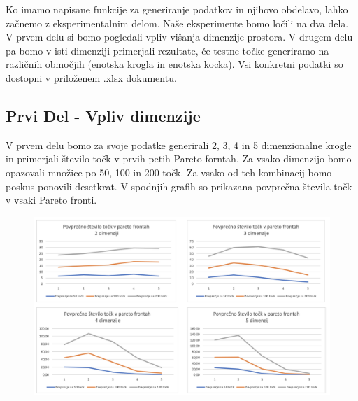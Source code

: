 \documentclass{article}
\begin{document}
Ko imamo napisane funkcije za generiranje podatkov in njihovo obdelavo, lahko začnemo z eksperimentalnim delom. Naše eksperimente bomo ločili na dva dela. V prvem delu si bomo pogledali vpliv višanja dimenzije prostora. V drugem delu pa bomo v isti dimenziji primerjali rezultate, če testne točke generiramo na različnih območjih (enotska krogla in enotska kocka). Vsi konkretni podatki so dostopni v priloženem .xlsx dokumentu.

\subsection{Prvi Del - Vpliv dimenzije}
V prvem delu bomo za svoje podatke generirali 2, 3, 4 in 5 dimenzionalne krogle in primerjali število točk v prvih petih Pareto forntah. Za vsako dimenzijo bomo opazovali množice po 50, 100 in 200 točk. Za vsako od teh kombinacij bomo poskus ponovili desetkrat. V spodnjih grafih so prikazana povprečna števila točk v vsaki Pareto fronti.

\break
\begin{figure}[htbp]
    \includegraphics[width=130mm]{Slike/Graf1.png}
\centering
\end{figure}
\end{document}
